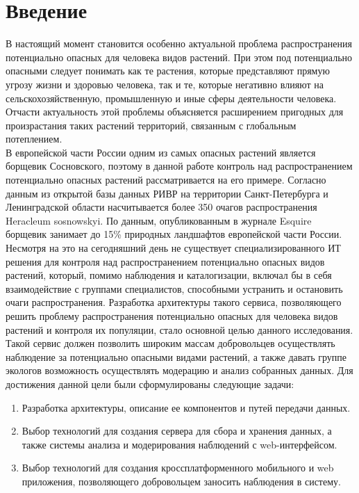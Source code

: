 \section{Введение}

\tab
В настоящий момент становится особенно актуальной проблема распространения потенциально опасных для человека видов растений.
При этом под потенциально опасными следует понимать как те растения, которые представляют прямую угрозу жизни и здоровью человека, так и те, которые негативно влияют на сельскохозяйственную, промышленную и иные сферы деятельности человека\cite{alien-plants}.
Отчасти актуальность этой проблемы объясняется расширением пригодных для произрастания таких растений территорий, связанным с глобальным потеплением\cite{invasive-plants, poisonous-ivy}. \\

\tab
В европейской части России одним из самых опасных растений является борщевик Сосновского\cite{heracleum}, поэтому в данной работе контроль над распространением потенциально опасных растений рассматривается на его примере.
Согласно данным из открытой базы данных РИВР\cite{rivr} на территории Санкт-Петербурга и Ленинградской области насчитывается более 350 очагов распространения Heracleum sosnowskyi.
По данным, опубликованным в журнале Esquire\cite{esquire} борщевик занимает до 15\% природных ландшафтов европейской части России. \\

\tab
Несмотря на это на сегодняшний день не существует специализированного ИТ решения для контроля над распространением потенциально опасных видов растений, который, помимо наблюдения и каталогизации, включал бы в себя взаимодействие с группами специалистов, способными устранить и остановить очаги распространения.
Разработка архитектуры такого сервиса, позволяющего решить проблему распространения потенциально опасных для человека видов растений и контроля их популяции, стало основной целью данного исследования.
Такой сервис должен позволить широким массам добровольцев осуществлять наблюдение за потенциально опасными видами растений, а также давать группе экологов возможность осуществлять модерацию и анализ собранных данных.
Для достижения данной цели были сформулированы следующие задачи:
\begin{enumerate}[topsep=0pt, parsep=0pt, itemsep=0pt, wide=0pt]
	\item Разработка архитектуры, описание ее компонентов и путей передачи данных.
	\item Выбор технологий для создания сервера для сбора и хранения данных, а также системы анализа и модерирования наблюдений с web-интерфейсом.
	\item Выбор технологий для создания кроссплатформенного мобильного и web приложения, позволяющего добровольцем заносить наблюдения в систему.
\end{enumerate}
